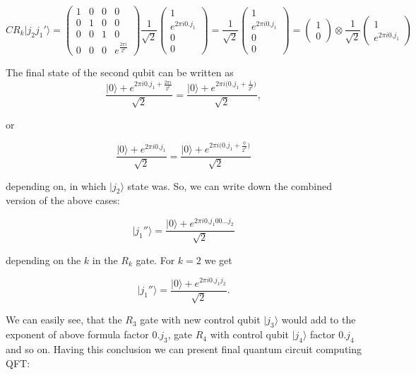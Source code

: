 \begin{itemize}
    \[ CR_k |j_2 j_1'\rangle = \begin{pmatrix} 1 & 0 & 0 & 0 \\ 0 & 1 & 0 & 0 \\ 0 & 0 & 1 & 0 \\ 0 & 0 & 0 & e^{\frac{2 \pi i}{2^k}} \end{pmatrix} \frac{1}{\sqrt{2}}\begin{pmatrix} 1 \\ e^{2 \pi i 0.j_1} \\ 0 \\ 0 \end{pmatrix} = \frac{1}{\sqrt{2}}\begin{pmatrix} 1 \\ e^{2 \pi i 0.j_1} \\ 0 \\ 0 \end{pmatrix} = \begin{pmatrix} 1 \\ 0 \end{pmatrix} \otimes \frac{1}{\sqrt{2}} \begin{pmatrix} 1 \\ e^{2 \pi i 0.j_1} \end{pmatrix}\]
\end{itemize}

The final state of the second qubit can be written as
\[ \frac{|0\rangle + e^{2 \pi i 0.j_1 + \frac{2 \pi i}{2^k}}}{\sqrt{2}} = \frac{|0\rangle + e^{2 \pi i \bigg( 0.j_1 + \frac{1}{2^k}\bigg)} }{\sqrt{2}}, \]

or

\[ \frac{|0\rangle + e^{2 \pi i 0.j_1}}{\sqrt{2}} = \frac{|0\rangle + e^{2 \pi i \bigg( 0.j_1 + \frac{0}{2^k} \bigg)}}{\sqrt{2}}\]

depending on, in which $|j_2\rangle$ state was. So, we can write down the combined version of the above cases:

\[|j_1''\rangle = \frac{|0\rangle + e^{2 \pi i 0.j_1 00...j_2}}{\sqrt{2}}\]

depending on the $k$ in the $R_k$ gate. For $k = 2$ we get

\[|j_1''\rangle = \frac{|0\rangle + e^{2 \pi i 0.j_1 j_2}}{\sqrt{2}}.\]

We can easily see, that the $R_3$ gate with new control qubit $|j_3\rangle$ would add to the exponent of above formula factor $0.j_3$, gate $R_4$ with control qubit $|j_4\rangle$ factor $0.j_4$ and so on. Having this conclusion we can present final quantum circuit computing QFT:

